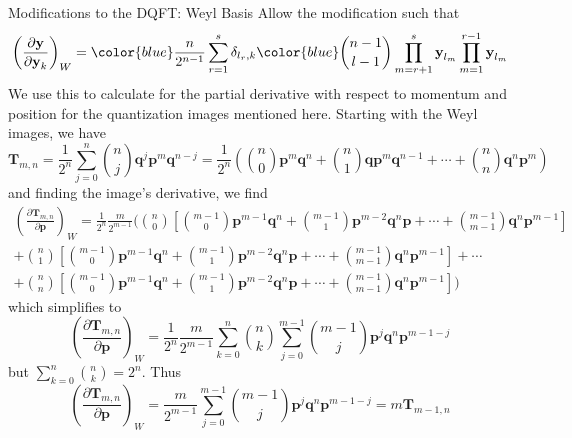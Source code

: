 \documentclass[aspectratio=169]{beamer}
\begin{document}
	\begin{frame}[allowframebreaks]{Modifications to the DQFT: Weyl Basis}
		Allow the modification such that
		\begin{equation}
			\left( \frac{\partial\textbf{y}}{\partial\textbf{y}_k}\right)_W={\color{blue}\frac{n}{2^{n-1}}}\sum_{r=1}^s\delta_{l_r,k}{\color{blue}\binom{n-1}{l-1}}\prod_{m=r+1}^s\textbf{y}_{l_m}\prod_{m=1}^{r-1}\textbf{y}_{l_m}
		\end{equation}
		We use this to calculate for the partial derivative with respect to momentum and position for the quantization images mentioned here. Starting with the Weyl images, we have
		\begin{equation}
			\textbf{T}_{m,n}=\frac{1}{2^n}\sum_{j=0}^n\binom{n}{j}\textbf{q}^j\textbf{p}^m\textbf{q}^{n-j}=\frac{1}{2^n}\left(\binom{n}{0}\textbf{p}^m\textbf{q}^n+\binom{n}{1}\textbf{q}\textbf{p}^m\textbf{q}^{n-1}+\cdots+\binom{n}{n}\textbf{q}^n\textbf{p}^m\right) 
		\end{equation}
		and finding the image's derivative, we find
		\begin{multline}
			\left( \frac{\partial\textbf{T}_{m,n}}{\partial\textbf{p}}\right)_W=\frac{1}{2^n}\frac{m}{2^{m-1}}\biggl(\binom{n}{0}\left[\binom{m-1}{0}\textbf{p}^{m-1}\textbf{q}^n+\binom{m-1}{1}\textbf{p}^{m-2}\textbf{q}^n\textbf{p}+\cdots+\binom{m-1}{m-1}\textbf{q}^n\textbf{p}^{m-1}\right]\\+\binom{n}{1}\left[\binom{m-1}{0}\textbf{p}^{m-1}\textbf{q}^n+\binom{m-1}{1}\textbf{p}^{m-2}\textbf{q}^n\textbf{p}+\cdots+\binom{m-1}{m-1}\textbf{q}^n\textbf{p}^{m-1}\right]+\cdots\\+\binom{n}{n}\left[\binom{m-1}{0}\textbf{p}^{m-1}\textbf{q}^n+\binom{m-1}{1}\textbf{p}^{m-2}\textbf{q}^n\textbf{p}+\cdots+\binom{m-1}{m-1}\textbf{q}^n\textbf{p}^{m-1}\right]\biggr) 
		\end{multline}
		which simplifies to
		\begin{equation}
			\left( \frac{\partial\textbf{T}_{m,n}}{\partial\textbf{p}}\right)_W=\frac{1}{2^n}\frac{m}{2^{m-1}}\sum_{k=0}^{n}\binom{n}{k}\sum_{j=0}^{m-1}\binom{m-1}{j}\textbf{p}^j\textbf{q}^{n}\textbf{p}^{m-1-j}
		\end{equation}
		but $\displaystyle\sum_{k=0}^n\binom{n}{k}=2^n$. Thus
		\begin{equation}
			\left( \frac{\partial\textbf{T}_{m,n}}{\partial\textbf{p}}\right)_W=\frac{m}{2^{m-1}}\sum_{j=0}^{m-1}\binom{m-1}{j}\textbf{p}^j\textbf{q}^{n}\textbf{p}^{m-1-j}=m\textbf{T}_{m-1,n}
		\end{equation}
		

\end{frame}
\end{document}
